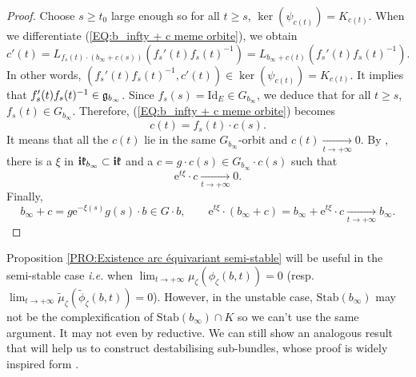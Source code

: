 \documentclass{article}
\theoremstyle{remark}
\theoremstyle{definition}
\newcommand{\tend}[2]{\underset{#1 \rightarrow #2}{\longrightarrow}}
\newcommand{\Stab}{\mathrm{Stab}}
\newcommand{\Id}{\mathrm{Id}}
\renewcommand{\i}{\boldsymbol{\mathrm{i}}}
\newcommand{\e}{\boldsymbol{\mathrm{e}}}
\renewcommand{\geq}{\geqslant}
\begin{document}
\begin{proof}
Choose $s \geq t_0$ large enough so for all $t \geq s$, $\ker(\psi_{c(t)}) = K_{c(t)}$. When we differentiate (\ref{EQ:b_infty + c meme orbite}), we obtain
$$
c'(t) = L_{f_s(t) \cdot (b_\infty + c(s))}(f_s'(t)f_s(t)^{-1}) = L_{b_\infty + c(t)}(f_s'(t)f_s(t)^{-1}).
$$
In other words, $(f_s'(t)f_s(t)^{-1},c'(t)) \in \ker(\psi_{c(t)}) = K_{c(t)}$. It implies that $f_s'(t)f_s(t)^{-1} \in \frak{g}_{b_\infty}$. Since $f_s(s) = \Id_E \in G_{b_\infty}$, we deduce that for all $t \geq s$, $f_s(t) \in G_{b_\infty}$. Therefore, (\ref{EQ:b_infty + c meme orbite}) becomes
$$
c(t) = f_s(t) \cdot c(s).
$$
It means that all the $c(t)$ lie in the same $G_{b_\infty}$-orbit and $c(t) \tend{t}{+\infty} 0$. By \cite[Theorem 12.4]{GRS}, there is a $\xi$ in $\i\frak{k}_{b_\infty} \subset \i\frak{k}$ and a $c = g \cdot c(s) \in G_{b_\infty} \cdot c(s)$ such that
$$
\e^{t\xi} \cdot c \tend{t}{+\infty} 0.
$$
Finally,
$$
b_\infty + c = g\e^{-\xi(s)}g(s) \cdot b \in G \cdot b, \qquad \e^{t\xi} \cdot (b_\infty + c) = b_\infty + \e^{t\xi} \cdot c \tend{t}{+\infty} b_\infty.
$$
\end{proof}

Proposition \ref{PRO:Existence arc équivariant semi-stable} will be useful in the semi-stable case \textit{i.e.} when $\lim_{t \rightarrow +\infty} \mu_\zeta(\phi_\zeta(b,t)) = 0$ (resp. $\lim_{t \rightarrow +\infty} \tilde{\mu}_\zeta(\tilde{\phi}_\zeta(b,t)) = 0$). However, in the unstable case, $\Stab(b_\infty)$ may not be the complexification of $\Stab(b_\infty) \cap K$ so we can't use the same argument. It may not even by reductive. We can still show an analogous result that will help us to construct destabilising sub-bundles, whose proof is widely inspired form \cite[Theorem 10.4]{GRS}.
\end{document}
